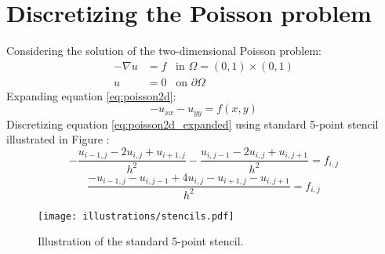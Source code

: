 
\section{Discretizing the Poisson problem} %
\label{sec:discretizing_the_poisson_problem}
Considering the solution of the two-dimensional Poisson problem:
\begin{align}
  - \nabla u &= f \;\;\; \text{in } \Omega = (0,1) \times (0,1) \label{eq:poisson2d} \\
  u &= 0 \;\;\; \text{on } \partial \Omega \label{eq:poisson2d_edge}
\end{align}
Expanding equation \eqref{eq:poisson2d}:
\begin{equation}
  -u_{xx} - u_{yy} = f(x,y) \label{eq:poisson2d_expanded}
\end{equation}
Discretizing equation \eqref{eq:poisson2d_expanded} using standard 5-point stencil illustrated in Figure :
\begin{equation}
  \nonumber
  - \frac{u_{i-1,j} - 2u_{i,j} + u_{i+1,j}}{h^2} - \frac{u_{i,j-1} - 2u_{i,j} + u_{i,j+1}}{h^2} = f_{i,j}
\end{equation}
\begin{equation}
  \frac{-u_{i-1,j} -u_{i,j-1} + 4u_{i,j} - u_{i+1,j} - u_{i,j+1}}{h^2} = f_{i,j}
\end{equation}


\begin{figure}[htbp]
  \centering
  \texttt{[image: illustrations/stencils.pdf]}
  \caption{Illustration of the standard 5-point stencil.}
  \label{fig:stencil}
\end{figure}


